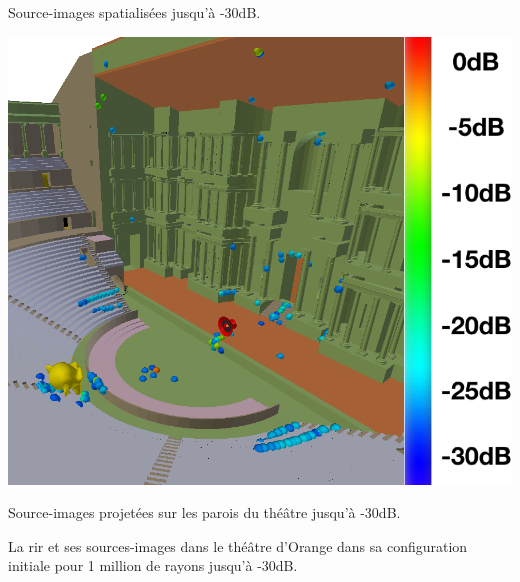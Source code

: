 \begin{figureth}
\begin{subfigureth}{0.36\textwidth}
		\caption{Source-images spatialisées jusqu'à -30dB.}
		\label{SI30dBbis}
	\end{subfigureth}
	\begin{subfigureth}{0.61\textwidth}
		\includegraphics[width=\linewidth]{images/SI30dB}
		\caption{Source-images projetées sur les parois du théâtre jusqu'à -30dB.}
		\label{SI30dB}
	\end{subfigureth}
\caption{La \gls{rir} et ses sources-images dans le théâtre d'Orange dans sa configuration initiale pour 1 million de rayons jusqu'à -30dB.}	
\label{SITheatre30}
\end{figureth}
%


